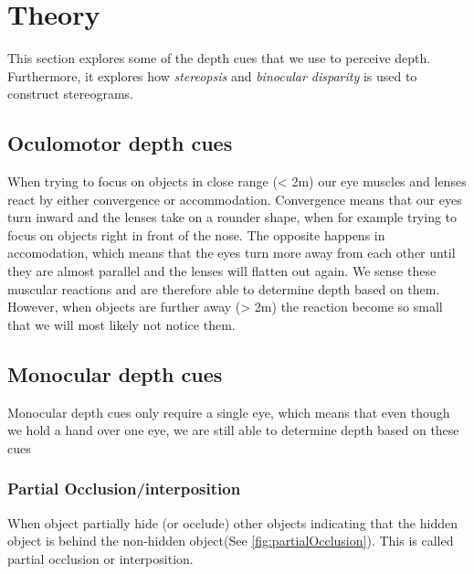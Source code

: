 \section{Theory}
This section explores some of the depth cues that we use to perceive depth. Furthermore, it explores how \textit{stereopsis} and \textit{binocular disparity} is used to construct stereograms.

\subsection{Oculomotor depth cues}
When trying to focus on objects in close range (< 2m) our eye muscles and lenses react by either convergence or accommodation. Convergence means that our eyes turn inward and the lenses take on a rounder shape, when for example trying to focus on objects right in front of the nose. The opposite happens in accomodation, which means that the eyes turn more away from each other until they are almost parallel and the lenses will flatten out again. We sense these muscular reactions and are therefore able to determine depth based on them. However, when objects are further away (> 2m) the reaction become so small that we will most likely not notice them\citep{sensationPerception}.

\subsection{Monocular depth cues}
Monocular depth cues only require a single eye, which means that even though we hold a hand over one eye, we are still able to determine depth based on these cues\citep{sensationPerception}

\subsubsection{Partial Occlusion/interposition}
When object partially hide (or occlude) other objects indicating that the hidden object is behind the non-hidden object(See \autoref{fig:partialOcclusion}). This is called partial occlusion or interposition\citep{sensationPerception}.

